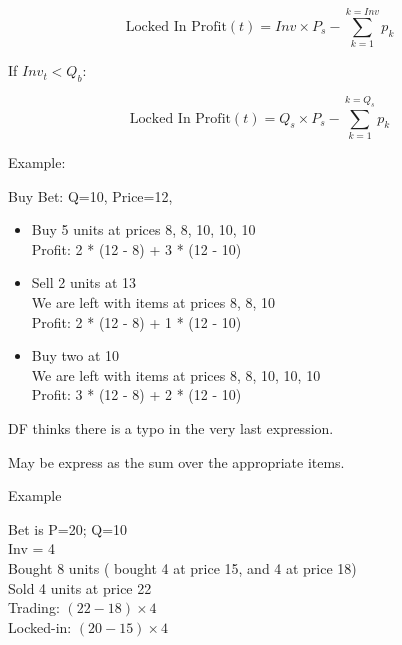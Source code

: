 \documentclass{article}
\begin{document}
    $$\text{Locked In Profit}(t) = 
    Inv \times P_s - \sum_{k=1}^{k=Inv} p_k$$
    
If $Inv_t<Q_b$:

    $$\text{Locked In Profit}(t) = 
    Q_s \times P_s - \sum_{k=1}^{k=Q_s} p_k$$


    
    
	
Example: 

Buy Bet: Q=10, Price=12,
\begin{itemize}
    \item Buy 5 units at prices 8, 8, 10, 10, 10 \\
    Profit: 2 * (12 - 8) + 3 * (12 - 10) %
    \item Sell 2 units at 13 \\
    We are left with items at prices 8, 8, 10 \\
    Profit: 2 * (12 - 8) + 1 * (12 - 10)
    \item Buy two at 10 \\
    We are left with items at prices 8, 8, 10, 10, 10 \\
    Profit: 3 * (12 - 8) + 2 * (12 - 10) %
\end{itemize}
DF thinks there is a typo in the very last expression.

May be express as the sum over the appropriate items.

Example

Bet is P=20; Q=10 \\
Inv = 4 \\
Bought 8 units  ( bought 4 at price 15, and 4 at price 18) \\
Sold 4 units at price 22 \\

Trading:  $(22-18) \times 4$ \\
Locked-in: $(20-15) \times 4$ \\
\end{document}
